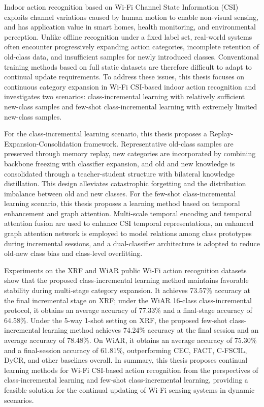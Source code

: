 
\begin{englishabstract}

    Indoor action recognition based on Wi-Fi Channel State Information (CSI) exploits channel variations caused by human motion to enable non-visual sensing, and has application value in smart homes, health monitoring, and environmental perception. Unlike offline recognition under a fixed label set, real-world systems often encounter progressively expanding action categories, incomplete retention of old-class data, and insufficient samples for newly introduced classes. Conventional training methods based on full static datasets are therefore difficult to adapt to continual update requirements. To address these issues, this thesis focuses on continuous category expansion in Wi-Fi CSI-based indoor action recognition and investigates two scenarios: class-incremental learning with relatively sufficient new-class samples and few-shot class-incremental learning with extremely limited new-class samples.

    For the class-incremental learning scenario, this thesis proposes a Replay-Expansion-Consolidation framework. Representative old-class samples are preserved through memory replay, new categories are incorporated by combining backbone freezing with classifier expansion, and old and new knowledge is consolidated through a teacher-student structure with bilateral knowledge distillation. This design alleviates catastrophic forgetting and the distribution imbalance between old and new classes. For the few-shot class-incremental learning scenario, this thesis proposes a learning method based on temporal enhancement and graph attention. Multi-scale temporal encoding and temporal attention fusion are used to enhance CSI temporal representations, an enhanced graph attention network is employed to model relations among class prototypes during incremental sessions, and a dual-classifier architecture is adopted to reduce old-new class bias and class-level overfitting.

    Experiments on the XRF and WiAR public Wi-Fi action recognition datasets show that the proposed class-incremental learning method maintains favorable stability during multi-stage category expansion. It achieves 73.57\% accuracy at the final incremental stage on XRF; under the WiAR 16-class class-incremental protocol, it obtains an average accuracy of 77.33\% and a final-stage accuracy of 64.58\%. Under the 5-way 1-shot setting on XRF, the proposed few-shot class-incremental learning method achieves 74.24\% accuracy at the final session and an average accuracy of 78.48\%. On WiAR, it obtains an average accuracy of 75.30\% and a final-session accuracy of 61.81\%, outperforming CEC, FACT, C-FSCIL, DyCR, and other baselines overall. In summary, this thesis proposes continual learning methods for Wi-Fi CSI-based action recognition from the perspectives of class-incremental learning and few-shot class-incremental learning, providing a feasible solution for the continual updating of Wi-Fi sensing systems in dynamic scenarios.


\end{englishabstract}
